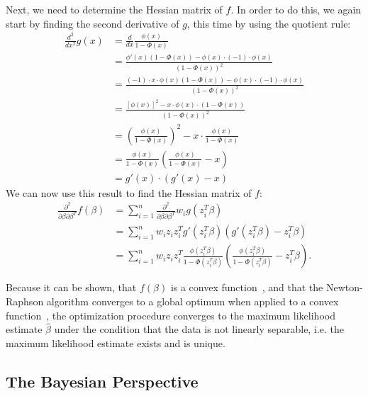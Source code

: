 \noindent Next, we need to determine the Hessian matrix of $f$. In order to do this,
we again start by finding the second derivative of $g$, this time by
using the quotient rule:
\begin{equation}
    \begin{split}
        \frac{d^2}{dx^2}g(x)
        & = \frac{d}{dx} \frac{\phi(x)}{1 - \Phi(x)} \\
        & = \frac{\phi'(x)(1 - \Phi(x)) - \phi(x) \cdot (-1) \cdot \phi(x)}
        {(1 - \Phi(x))^2} \\
        & = \frac{(-1) \cdot x \cdot \phi(x)(1 - \Phi(x)) - \phi(x) \cdot (-1) \cdot \phi(x)}
        {(1 - \Phi(x))^2} \\
        & = \frac{[\phi(x)]^2 - x \cdot \phi(x) \cdot (1 - \Phi(x))}{(1 - \Phi(x))^2} \\
        & = \left(\frac{\phi(x)}{1 - \Phi(x)}\right)^2 - x \cdot \frac{\phi(x)}{1 - \Phi(x)} \\
        & = \frac{\phi(x)}{1 - \Phi(x)} \left( \frac{\phi(x)}{1 - \Phi(x)} - x \right)  \\
        & = g'(x) \cdot (g'(x) - x)
    \end{split}
\end{equation}
We can now use this result to find the Hessian matrix of $f$:
\begin{equation}
    \begin{split}
        \frac{\partial^2}{\partial \beta \partial \beta^T} f(\beta)
        & = \sum_{i=1}^n
        \frac{\partial^2}{\partial \beta \partial \beta^T} w_i g(z_i^T \beta)\\
        & = \sum_{i=1}^n w_i z_i z_i^T g'(z_i^T \beta)(g'(z_i^T \beta) - z_i^T \beta)\\
        & = \sum_{i=1}^n w_i z_i z_i^T
        \frac{\phi(z_i^T \beta)}{1 - \Phi(z_i^T \beta)} \left( \frac{\phi(z_i^T \beta)}{1 - \Phi(z_i^T \beta)} - z_i^T \beta \right).
    \end{split}
\end{equation}

\noindent Because it can be shown, that
$f(\beta)$ is a convex function~\cite{wedderburn},
and that the Newton-Raphson algorithm converges to
a global optimum when applied to a convex
function~\cite{numerical-optimization},
the optimization procedure converges to the
maximum likelihood estimate $\hat{\beta}$ under the condition that
the data is not linearly separable, i.e. the maximum likelihood
estimate exists and is unique.

\subsection{The Bayesian Perspective}

